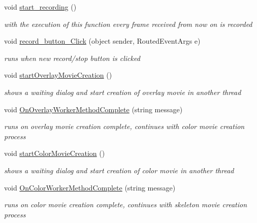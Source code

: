 \begin{DoxyCompactItemize}
void \hyperlink{classUTKinectSkeletonMovementDetector_1_1MainWindow_a62e275c41f9a07b84b91cb5192be5dc2}{start\-\_\-recording} ()
\begin{DoxyCompactList}\small\item\em with the execution of this function every frame received from now on is recorded \end{DoxyCompactList}\item 
void \hyperlink{classUTKinectSkeletonMovementDetector_1_1MainWindow_a0847209581cf66a51945a1871646ed22}{record\-\_\-button\-\_\-\-Click} (object sender, Routed\-Event\-Args e)
\begin{DoxyCompactList}\small\item\em runs when new record/stop button is clicked \end{DoxyCompactList}\item 
void \hyperlink{classUTKinectSkeletonMovementDetector_1_1MainWindow_ac8729c33290d9d0789c9d9f96ce40aa8}{start\-Overlay\-Movie\-Creation} ()
\begin{DoxyCompactList}\small\item\em shows a waiting dialog and start creation of overlay movie in another thread \end{DoxyCompactList}\item 
void \hyperlink{classUTKinectSkeletonMovementDetector_1_1MainWindow_ac3ba79a229a46ae04ff26002d5d246ed}{On\-Overlay\-Worker\-Method\-Complete} (string message)
\begin{DoxyCompactList}\small\item\em runs on overlay movie creation complete, continues with color movie creation process \end{DoxyCompactList}\item 
void \hyperlink{classUTKinectSkeletonMovementDetector_1_1MainWindow_a66411f588ba5705ca061637de3c60891}{start\-Color\-Movie\-Creation} ()
\begin{DoxyCompactList}\small\item\em shows a waiting dialog and start creation of color movie in another thread \end{DoxyCompactList}\item 
void \hyperlink{classUTKinectSkeletonMovementDetector_1_1MainWindow_a854069a07e92baa8a974b7f9f56691ff}{On\-Color\-Worker\-Method\-Complete} (string message)
\begin{DoxyCompactList}\small\item\em runs on color movie creation complete, continues with skeleton movie creation process \end{DoxyCompactList}\item 

\end{DoxyCompactItemize}
